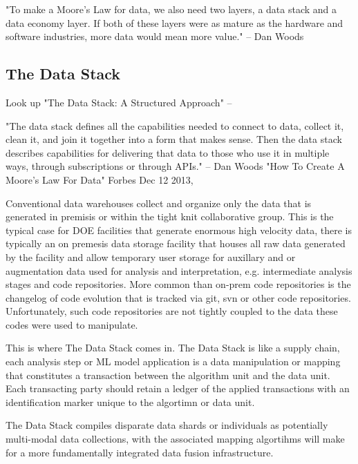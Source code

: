 \documentclass{article}
\begin{document}
"To make a Moore’s Law for data, we also need two layers, a data stack and a data economy layer. If both of these layers were as mature as the hardware and software industries, more data would
mean more value." -- Dan Woods \cite{Woods2013} %

\subsection{The Data Stack}
Look up "The Data Stack: A Structured Approach" -- \cite{Elbaz2012}%

"The data stack defines all the capabilities needed to connect to data, collect it, clean it, and join it together into a form that makes sense.
Then the data stack describes capabilities for delivering that data to those who use it in multiple
ways, through subscriptions or through APIs." -- Dan Woods "How To Create A Moore's Law For Data" Forbes Dec 12 2013, \cite{Woods2013} %

Conventional data warehouses collect and organize only the data that is generated in premisis or within the tight knit collaborative group.
This is the typical case for DOE facilities that generate enormous high velocity data, there is typically an on premesis data storage facility that houses all raw data generated by the facility and allow temporary user storage for auxillary and or augmentation data used for analysis and interpretation, e.g. intermediate analysis stages and code repositories.
More common than on-prem code repositories is the changelog of code evolution that is tracked via git, svn or other code repositories.
Unfortunately, such code repositories are not tightly coupled to the data these codes were used to manipulate.

This is where The Data Stack comes in.
The Data Stack is like a supply chain, each analysis step or ML model application is a data manipulation or mapping that constitutes a transaction between the algorithm unit and the data unit.
Each transacting party should retain a ledger of the applied transactions with an identification marker unique to the algortimn or data unit.


The Data Stack compiles disparate data shards or individuals as potentially multi-modal data collections, with the associated mapping algortihms will make for a more fundamentally integrated data fusion infrastructure.
\end{document}
